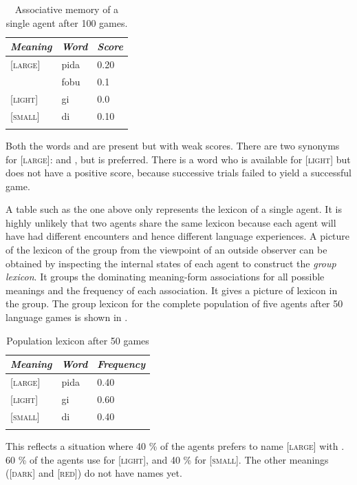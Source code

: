 \begin{table}
\begin{center}
\begin{tabular}{l  l  l }
\lsptoprule 
{\itshape Meaning} & {\itshape Word} & {\itshape Score} \\ \midrule
{}[\textsc{large}]& pida& 0.20\\ 
  & fobu& 0.1\\ 
{}[\textsc{light}]& gi& 0.0\\ 
{}[\textsc{small}]& di & 0.10\\ 
\lspbottomrule
\end{tabular}
\caption{\label{tab:t-mem3}Associative memory of a single agent after 100 games.}
\end{center}
\end{table}
Both the words  and  are present but with 
weak scores. There are two synonyms for 
{}[\textsc{large}]:  and , but  is 
preferred. There is a word  who is available 
for [\textsc{light}] but does not have a positive score,
because successive trials failed to yield a successful game. 

A table such as the one above only represents the lexicon
of a single agent. It is highly unlikely that two agents
share the same lexicon because each agent will have 
had different encounters and hence different language
experiences. A picture of the lexicon of the group from the 
viewpoint of an outside observer can be obtained by
inspecting the internal states of each agent to 
construct the {\itshape group lexicon}. It groups the 
dominating meaning-form associations for all possible
meanings and the frequency of each association. 
It gives a picture of  lexicon 
in the group. The group lexicon
for the complete population of five agents after 50 language games
is shown in . 

\begin{table}
\begin{center}
\begin{tabular}{l  l  l }
\lsptoprule 
{\itshape Meaning}& {\itshape Word} & {\itshape Frequency} \\ \midrule 
{}[\textsc{large}]& pida& 0.40\\ 
{}[\textsc{light}]& gi & 0.60\\ 
{}[\textsc{small}]& di & 0.40\\ 
\lspbottomrule
\end{tabular}
\caption{\label{tab:t-mem4}Population lexicon after 50 games}
\end{center}
\end{table}
This reflects a situation where 40 \%
of the agents prefers to name [\textsc{large}] with
. 60 \% of the agents
use  for [\textsc{light}], and 40 \%  for [\textsc{small}]. 
The other meanings ([\textsc{dark}] and [\textsc{red}]) do not have names yet. 

